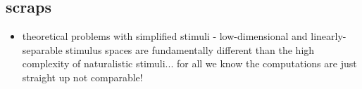 \begin{multicols}{2}
\subsection{scraps}

\begin{itemize}
\item theoretical problems with simplified stimuli - low-dimensional and linearly-separable stimulus spaces are fundamentally different than the high complexity of naturalistic stimuli... for all we know the computations are just straight up not comparable! \cite{schuesslerInterplayRandomnessStructure2020}

\end{itemize}

\end{multicols}

% 